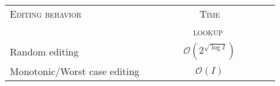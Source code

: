 
\begin{tabularx}{0.6\textwidth}{@{}Xc@{}}
  \toprule
  \textsc{Editing behavior} & \textsc{Time} \\
  & \ \ \ \ \ \ \ \ \ \textsc{lookup} \ \ \ \ \ \ \ \ \ \\ \midrule
  Random editing & $\mathcal{O}(2^{\sqrt{\log I}})$ \\
  Monotonic/Worst case editing & $\mathcal{O}(I)$ \\ \bottomrule
\end{tabularx}

